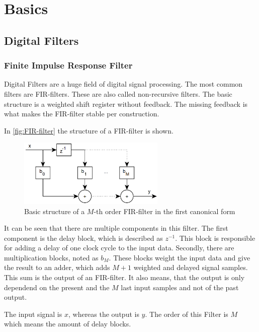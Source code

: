 \section{Basics}

\subsection{Digital Filters}

\subsubsection{Finite Impulse Response Filter}

Digital Filters are a huge field of digital signal processing. The most common filters are \ac{FIR}-filters.
These are also called \frqq non-recursive filters\flqq .
The basic structure is a weighted shift register without feedback. The missing feedback is what makes
the \ac{FIR}-filter stable per construction.

In \autoref{fig:FIR-filter} the structure of a \ac{FIR}-filter is shown.

\begin{figure}[!h]
    \centering
    \includegraphics[width=7cm]{img/fir.png}
    \caption{Basic structure of a $M$-th order \ac{FIR}-filter in the first canonical form \cite{meyer_signalverarbeitung}}
    \label{fig:FIR-filter}
\end{figure}

It can be seen that there are multiple components in this filter. The first component is the delay block,
which is described as $z^{-1}$. This block is responsible for adding a delay of one clock cycle to the input data.
Secondly, there are multiplication blocks, noted as $b_M$. These blocks weight the input data and give the
result to an adder, which adds $M+1$ weighted and delayed signal samples. This sum is the output of an
\ac{FIR}-filter. It also means, that the output is only dependend on the present and the $M$ last input samples
and not of the past output.

The input signal is $x$, whereas the output is $y$. The order of this Filter is $M$ which means the amount of
delay blocks.

